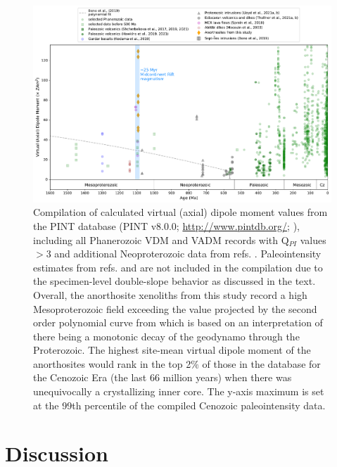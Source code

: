 \begin{figure}[h!]
\noindent\includegraphics[width=\textwidth]{figure/Zhang2022/PINT_compilation.pdf}
\centering
\caption[Compilation of geomagnetic virtual (axial) dipole moment through Earth's history]{\footnotesize{Compilation of calculated virtual (axial) dipole moment values from the PINT database (PINT v8.0.0; \url{http://www.pintdb.org/}; \citealp{Bono2022a}), including all Phanerozoic VDM and VADM records with Q$_{PI}$ values $>$3 and additional Neoproterozoic data from refs. \citealp{Lloyd2021a, Lloyd2021b, Thallner2021a, Thallner2021b}. Paleointensity estimates from refs. \citealp{Pesonen1983a} and \citealp{Kulakov2013a} are not included in the compilation due to the specimen-level double-slope behavior as discussed in the text. Overall, the anorthosite xenoliths from this study record a high Mesoproterozoic field exceeding the value projected by the second order polynomial curve from \citealp{Bono2019a} which is based on an interpretation of there being a monotonic decay of the geodynamo through the Proterozoic. The highest site-mean virtual dipole moment of the anorthosites would rank in the top 2$\%$ of those in the database for the Cenozoic Era (the last 66 million years) when there was unequivocally a crystallizing inner core. The y-axis maximum is set at the 99th percentile of the compiled Cenozoic paleointensity data.}}
\label{fig:PINT_compilation}
\end{figure}

\section{Discussion}

